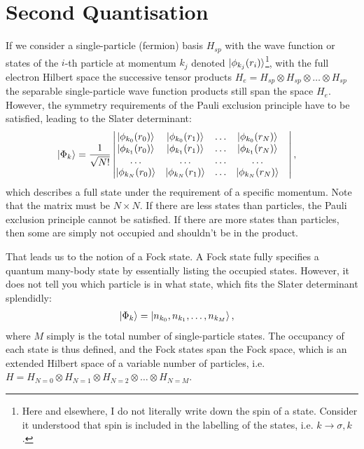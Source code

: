 \section{Second Quantisation}
\label{sec:secondquantisation}
If we consider a single-particle (fermion) basis $H_{sp}$ with the wave function or states of the $i$-th particle at momentum $k_j$ denoted $\ket{\phi_{k_j}(r_i)}$\footnote{Here and elsewhere, I do not literally write down the spin of a state. Consider it understood that spin is included in the labelling of the states, i.e. $k \rightarrow \sigma, k$.}, with the full electron Hilbert space the successive tensor products $H_{e} = H_{sp} \otimes H_{sp} \otimes \ldots \otimes H_{sp}$ the separable single-particle wave function products still span the space $H_e$. However, the symmetry requirements of the Pauli exclusion principle have to be satisfied, leading to the Slater determinant\cite{yuli}:
\begin{align}
\ket{\Phi_k} &= \frac{1}{\sqrt{N!}} \begin{vmatrix}
\ket{\phi_{k_0}(r_0)} & \ket{\phi_{k_0}(r_1)} &\ldots& \ket{\phi_{k_0}(r_N)} \\
\ket{\phi_{k_1}(r_0)} & \ket{\phi_{k_1}(r_1)} &\ldots& \ket{\phi_{k_1}(r_N)} \\
\ldots&\ldots&\ldots&\ldots&\\
\ket{\phi_{k_N}(r_0)} & \ket{\phi_{k_N}(r_1)} &\ldots& \ket{\phi_{k_N}(r_N)} \\
\end{vmatrix},
\label{eq:slaterdeterminant}
\end{align}
which describes a full state under the requirement of a specific momentum. Note that the matrix must be $N\times N$. If there are less states than particles, the Pauli exclusion principle cannot be satisfied. If there are more states than particles, then some are simply not occupied and shouldn't be in the product.

That leads us to the notion of a Fock state. A Fock state fully specifies a quantum many-body state by essentially listing the occupied states. However, it does not tell you which particle is in what state, which fits the Slater determinant splendidly:
\begin{align}
\ket{\Phi_k} &= \ket{n_{k_0}, n_{k_1},\ldots, n_{k_M}},
\label{eq:fock}
\end{align}
where $M$ simply is the total number of single-particle states. The occupancy of each state is thus defined, and the Fock states span the Fock space, which is an extended Hilbert space of a variable number of particles, i.e. $H = H_{N=0} \otimes H_{N=1} \otimes H_{N=2}\otimes \ldots \otimes H_{N=M}$. 


